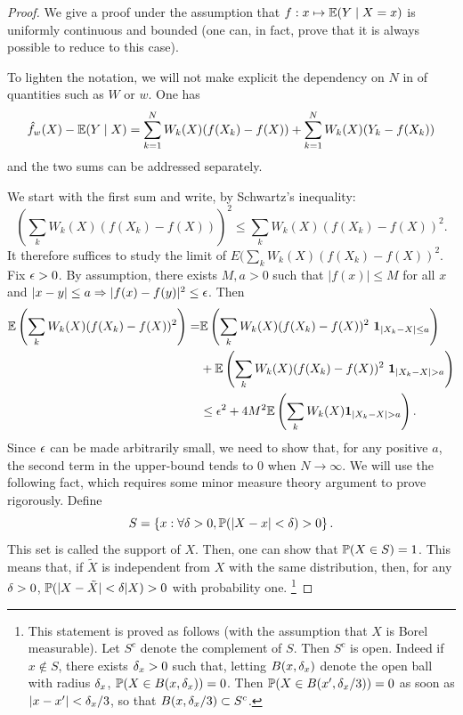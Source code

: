 \begin{proof}
We give a proof under the assumption that $f: x \mapsto \bm{\mathbb E}(Y\mid X=x)$ is uniformly continuous and
bounded (one can, in fact, prove that it is always possible to reduce to this case).

To lighten the notation, we will not make explicit the dependency on $N$ in of quantities such as $W$ or $w$. One has
\begin{equation}
\label{eq:nn.proof}
{\hat{f}}_w(X) - \bm{\mathbb E}(Y\mid X) =
\sum_{k=1}^N
W_{k}(X) (f(X_k) - f(X)) +
  \sum_{k=1}^N W_{k}(X) (Y_k - f(X_k)) 
\end{equation}
and the two sums can be addressed separately. 

%
We start with the first sum  and write, by Schwartz's inequality:
$$
\left(\sum_k W_{k}(X)(f(X_k) - f(X))\right)^2 \leq \sum_k
W_{k}(X)(f(X_k) - f(X))^2.
$$
It therefore suffices to study the limit of 
$E(\sum_k W_{k}(X) (f(X_k)- f(X))^2$. Fix $\epsilon>0$. By assumption, there
exists $M,a>0$ such that $|f(x)| \leq M$ for all $x$ and $|x-y|\leq a
\Rightarrow |f(x)-f(y)|^2 \leq \epsilon$.  Then
\begin{align*}
\myE\left(\sum_k W_{k}(X) (f(X_k)- f(X))^2\right) =& \myE\left(\sum_k W_{k}(X) (f(X_k)- f(X))^2\ \bfone_{|X_k-X|\leq
a}\right) \\
& + \myE\left(\sum_k W_{k}(X) (f(X_k)- f(X))^2\ \bfone_{|X_k-X|> a}\right) \\
&\leq \ep^2 + 4M^2 \myE\left(\sum_k W_{k}(X)  \bfone_{|X_k-X|> a}\right).
\end{align*}
Since $\epsilon$ can be made arbitrarily small, we need to show that, for any positive $a$, the second term in the upper-bound tends to 0  when $N\to\infty$.
We will use the following fact, which requires some minor measure theory argument to prove rigorously. Define
$$
S  = \left\{ x: \forall \delta > 0, \bm{\mathbb P}(|X-x|<\delta) > 0 \right\}.
$$
This set  is called the support of $X$. Then, one can show that $\bm{\mathbb P}(X\in S) = 1$. This means
that, if $\tilde X$ is independent from $X$ with the same
distribution, then, for any $\delta >0$,
$\bm{\mathbb P}(|X-\tilde X| <\delta|X) > 0$ with probability one.
\footnote{This statement is proved  as follows (with the assumption that $X$ is Borel measurable). Let $S^c$ denote the complement of $S$. 
Then $S^c$ is open. 
Indeed if $x\not\in S$, there exists $\delta_x>0$ such that, letting $B(x, \delta_x)$ denote the open ball with radius $\delta_x$, $\bm{\mathbb P}(X\in {B}(x, \delta_x)) = 0$. Then $\bm{\mathbb P}(X\in B(x', \delta_x/3)) = 0$ as soon as $|x-x'|<\delta_x/3$, so that $B(x, \delta_x/3)\subset S^c$.

}
\end{proof}
